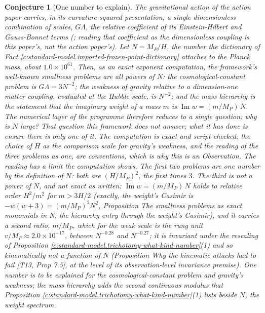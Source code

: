 \documentclass[11pt]{article}
\newtheorem{conjecture}[theorem]{Conjecture}
\theoremstyle{definition}
\theoremstyle{plain}
\newcommand{\changedmark}[2]{\marginpar{\raggedright\scriptsize\color{#1}#2}}
\begin{document}
\begin{conjecture}[One number to explain]\label{c:standard-model.one-number-explain}
\changedmark{BrickRed}{corrected since the deposit}
The gravitational action of the action paper carries, in its curvature-squared presentation, a single dimensionless combination of scales, $G\Lambda$, the relative coefficient of its Einstein-Hilbert and Gauss-Bonnet terms (\cite[Thm.~3.1(2)]{ButlerT10}; reading that coefficient as \emph{the} dimensionless coupling is this paper's, not the action paper's). Let $N = M_{P}/H$, the number the dictionary of Fact \ref{c:standard-model.imported-frozen-point-dictionary} attaches to the Planck mass, about $1.0 \times 10^{61}$. Then, as an exact exponent computation, the framework's well-known smallness problems are all powers of $N$: the cosmological-constant problem is $G\Lambda = 3N^{-2}$; the weakness of gravity relative to a dimension-one matter coupling, evaluated at the Hubble scale, is $N^{-2}$; and the mass hierarchy is the statement that the imaginary weight of a mass $m$ is $\operatorname{Im} w = (m/M_{P})\,N$. The numerical layer of the programme therefore reduces to a single question: why is $N$ large? That question this framework does not answer; what it has done is ensure there is only one of it. The computation is exact and script-checked; the choice of $H$ as the comparison scale for gravity's weakness, and the reading of the three problems as one, are conventions, which is why this is an Observation. The reading has a limit the computation shows. The first two problems are one number by the definition of $N$: both are $(H/M_{P})^{2}$, the first times $3$. The third is not a power of $N$, and not exact as written: $\operatorname{Im} w = (m/M_{P})\,N$ holds to relative order $H^{2}/m^{2}$ for $m > 3H/2$ (exactly, the weight's Casimir is $-w(w+3) = (m/M_{P})^{2}N^{2}$, Proposition \emph{The smallness problems as exact monomials in N, the hierarchy entry through the weight's Casimir}), and it carries a second ratio, $m/M_{P}$, which for the weak scale is the rung unit $v/M_{P} \approx 2.0 \times 10^{-17}$, between $N^{-0.28}$ and $N^{-0.27}$; it is invariant under the rescaling of Proposition \ref{c:standard-model.trichotomy-what-kind-number}(1) and so kinematically not a function of $N$ (Proposition \emph{Why the kinematic attacks had to fail} [T13, Prop 7.5], at the level of its observation-level invariance premise). One number is to be explained for the cosmological-constant problem and gravity's weakness; the mass hierarchy adds the second continuous modulus that Proposition \ref{c:standard-model.trichotomy-what-kind-number}(1) lists beside $N$, the weight spectrum.
\end{conjecture}
\end{document}
